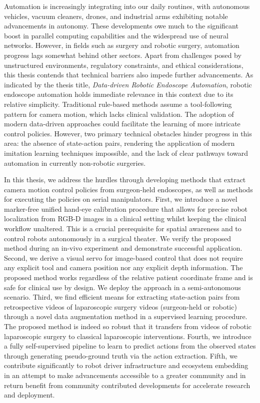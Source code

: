 Automation is increasingly integrating into our daily routines, with autonomous vehicles, vacuum cleaners, drones, and industrial arms exhibiting notable advancements in autonomy. These developments owe much to the significant boost in parallel computing capabilities and the widespread use of neural networks. However, in fields such as surgery and robotic surgery, automation progress lags somewhat behind other sectors. Apart from challenges posed by unstructured environments, regulatory constraints, and ethical considerations, this thesis contends that technical barriers also impede further advancements. As indicated by the thesis title, \textit{Data-driven Robotic Endoscope Automation}, robotic endoscope automation holds immediate relevance in this context due to its relative simplicity. Traditional rule-based methods assume a tool-following pattern for camera motion, which lacks clinical validation. The adoption of modern data-driven approaches could facilitate the learning of more intricate control policies. However, two primary technical obstacles hinder progress in this area: the absence of state-action pairs, rendering the application of modern imitation learning techniques impossible, and the lack of clear pathways toward automation in currently non-robotic surgeries.

In this thesis, we address the hurdles through developing methods that extract camera motion control policies from surgeon-held endoscopes, as well as methods for executing the policies on serial manipulators. First, we introduce a novel marker-free unified hand-eye calibration procedure that allows for precise robot localization from RGB-D images in a clinical setting whilst keeping the clinical workflow unaltered. This is a crucial prerequisite for spatial awareness and to control robots autonomously in a surgical theater. We verify the proposed method during an in-vivo experiment and demonstrate successful application. Second, we derive a visual servo for image-based control that does not require any explicit tool and camera position nor any explicit depth information. The proposed method works regardless of the relative patient coordinate frame and is safe for clinical use by design. We deploy the approach in a semi-autonomous scenario.
Third, we find efficient means for extracting state-action pairs from retrospective videos of laparoscopic surgery videos (surgeon-held or robotic) through a novel data augmentation method in a supervised learning procedure. The proposed method is indeed so robust that it transfers from videos of robotic laparoscopic surgery to classical laparoscopic interventions. Fourth, we introduce a fully self-supervised pipeline to learn to predict actions from the observed states through generating pseudo-ground truth via the action extraction. Fifth, we contribute significantly to robot driver infrastructure and ecosystem embedding in an attempt to make advancements accessible to a greater community and in return benefit from community contributed developments for accelerate research and deployment.

